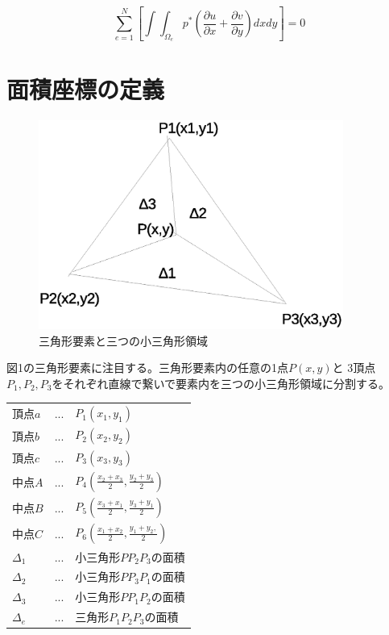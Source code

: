 \documentclass{jarticle}
\begin{document}
\begin{equation}
\displaystyle
\sum_{e=1}^N\left[\int\int_{\Omega_e} p^*\left(\frac{\partial u}{\partial x}+\frac{\partial v}{\partial y}\right)dxdy\right] = 0
\end{equation}



\section{面積座標の定義}

\begin{figure}
\begin{center} 
\includegraphics[width=10cm]{area_coordinates.eps}
\caption{三角形要素と三つの小三角形領域}
\end{center}
\end{figure}


図1の三角形要素に注目する。三角形要素内の任意の1点$P(x,y)$と
3頂点$P_1,P_2,P_3$をそれぞれ直線で繋いで要素内を三つの小三角形領域に分割する。

\begin{center}
\begin{tabular}{lll}
  $頂点a$&...&$P_1(x_1,y_1)$\\
  $頂点b$&...&$P_2(x_2,y_2)$\\
  $頂点c$&...&$P_3(x_3,y_3)$\\
  $中点A$&...&$P_4(\frac{x_2+x_3}{2},\frac{y_2+y_3}{2})$\\
  $中点B$&...&$P_5(\frac{x_3+x_1}{2},\frac{y_3+y_1}{2})$\\
  $中点C$&...&$P_6(\frac{x_1+x_2}{2},\frac{y_1+y_2,}{2})$\\
  $\Delta_1$&...&小三角形$PP_2 P_3$の面積\\
  $\Delta_2$&...&小三角形$PP_3 P_1$の面積\\
  $\Delta_3$&...&小三角形$PP_1 P_2$の面積\\
  $\Delta_e$&...&三角形$P_1 P_2 P_3$の面積
\end{tabular}
\end{center}
\end{document}
